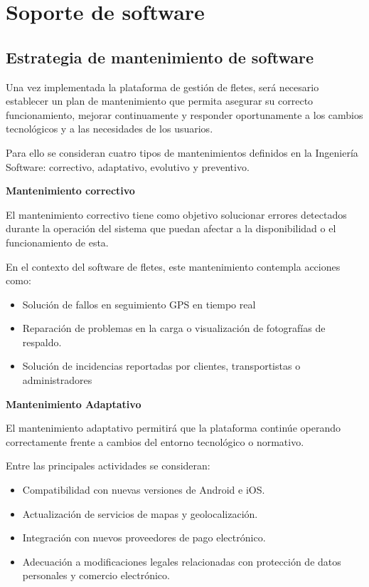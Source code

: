 \chapter{Soporte de software}
\label{Soporte de software}

\section{Estrategia de mantenimiento de software}

Una vez implementada la plataforma de gestión de fletes, será necesario establecer un plan de mantenimiento que permita asegurar su correcto funcionamiento, mejorar continuamente y responder oportunamente a los cambios tecnológicos y a las necesidades de los usuarios.

Para ello se consideran cuatro tipos de mantenimientos definidos en la Ingeniería Software: correctivo, adaptativo, evolutivo y preventivo.

\noindent \textbf{Mantenimiento correctivo}

El mantenimiento correctivo tiene como objetivo solucionar errores detectados durante la operación del sistema que puedan afectar a la disponibilidad o el funcionamiento de esta.

En el contexto del software de fletes, este mantenimiento contempla acciones como:

\begin{itemize}
	\item Solución de fallos en seguimiento GPS en tiempo real
	\item Reparación de problemas en la carga o visualización de fotografías de respaldo.
	\item Solución de incidencias reportadas por clientes, transportistas o administradores
\end{itemize}

\noindent \textbf{Mantenimiento Adaptativo}

El mantenimiento adaptativo permitirá que la plataforma continúe operando correctamente frente a cambios del entorno tecnológico o normativo.

Entre las principales actividades se consideran:

\begin{itemize}
	\item Compatibilidad con nuevas versiones de Android e iOS.
	\item Actualización de servicios de mapas y geolocalización. 
	\item Integración con nuevos proveedores de pago electrónico.
	\item Adecuación a modificaciones legales relacionadas con protección de datos personales y comercio electrónico. 
\end{itemize}

